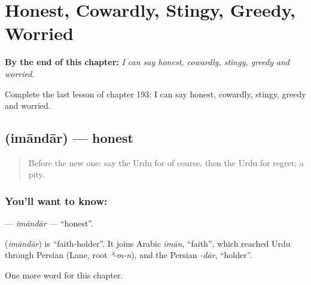 
\chapter{Honest, Cowardly, Stingy, Greedy, Worried}
\label{ch:ur-honest-cowardly-stingy-greedy-worried}

\begin{chapteropening}
\textbf{By the end of this chapter:} \emph{I can say honest, cowardly, stingy, greedy and worried.}

Complete the last lesson of chapter 193: I can say honest, cowardly, stingy, greedy and worried.
\end{chapteropening}

\section[\texorpdfstring{\ur{ایماندار} (imāndār)}{ایماندار (imāndār)}]{ (imāndār) — honest}

\label{lesson:UR-C193-imandar}



\begin{quote}
Before the new one: say the Urdu for of course, then the Urdu for regret; a pity.
\end{quote}

\subsection*{You'll want to know: }
\textbf{} — \emph{imāndār} — \textquotedblleft{}honest\textquotedblright{}.

\begin{cousinweb}
\textbf{} (\emph{imāndār}) is \textquotedblleft{}faith-holder\textquotedblright{}. It joins Arabic \emph{īmān}, \textquotedblleft{}faith\textquotedblright{}, which reached Urdu through Persian (Lane, root \emph{ʾ-m-n}), and the Persian \emph{-dār}, \textquotedblleft{}holder\textquotedblright{}.
\end{cousinweb}

\begin{grammarlens}[title={What you've built}]
One more word for this chapter.
\end{grammarlens}

